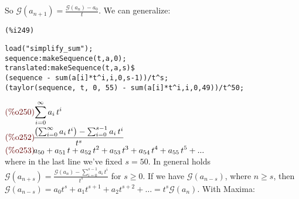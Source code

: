 So $\mathcal{G}(a_{n+1}) =  \frac{\mathcal{G} (a_n) - a_0}{t}$. We can
generalize:\\
\noindent
\begin{minipage}[t]{8ex}{\color{red}\bf
\begin{verbatim}
(%i249) 
\end{verbatim}}
\end{minipage}
\begin{minipage}[t]{\textwidth}{\color{blue}
\begin{verbatim}
load("simplify_sum");
sequence:makeSequence(t,a,0);
translated:makeSequence(t,a,s)$
(sequence - sum(a[i]*t^i,i,0,s-1))/t^s;
(taylor(sequence, t, 0, 55) - sum(a[i]*t^i,i,0,49))/t^50;
\end{verbatim}}
\end{minipage}
\begin{math}\displaystyle
\parbox{8ex}{\color{labelcolor}(\%o250) }
\sum_{i=0}^{\infty }{a}_{i}\,{t}^{i}
\end{math}\\
\begin{math}\displaystyle
\parbox{8ex}{\color{labelcolor}(\%o252) }
\frac{\left( \sum_{i=0}^{\infty }{a}_{i}\,{t}^{i}\right) -\sum_{i=0}^{s-1}{a}_{i}\,{t}^{i}}{{t}^{s}}
\end{math}\\
\begin{math}\displaystyle
\parbox{8ex}{\color{labelcolor}(\%o253) }
{a}_{50}+{a}_{51}\,t+{a}_{52}\,{t}^{2}+{a}_{53}\,{t}^{3}+{a}_{54}\,{t}^{4}+{a}_{55}\,{t}^{5}+...
\end{math}\\
where in the last line we've fixed $s = 50$. In general holds
$\mathcal{G}(a_{n+s}) = \frac{\mathcal{G} (a_n)
  -\sum_{i=0}^{s-1}{a}_{i}\,{t}^{i}}{{t}^{s}}$ for $s \geq 0$. If we
have $\mathcal{G} (a_{n-s})$, where $n \geq s $, then $\mathcal{G}
(a_{n-s}) = a_0 t^s + a_1 t^{s+1} + a_2 t^{s+2} + \ldots
= t^s \mathcal{G} (a_n)$. With Maxima:\\

